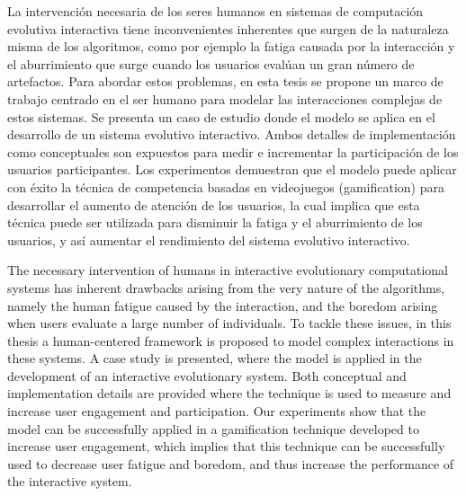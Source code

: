 


La intervenci\'on necesaria de los seres humanos en sistemas de computaci\'on
evolutiva interactiva tiene inconvenientes inherentes que surgen de la
naturaleza misma de los algoritmos, como por ejemplo la fatiga causada por la
interacci\'on y el aburrimiento que surge cuando los usuarios eval\'uan un gran
n\'umero de artefactos. Para abordar estos problemas, en esta tesis se propone
un marco de trabajo centrado en el ser humano para
modelar las interacciones complejas de estos sistemas. Se presenta un caso de
estudio donde el modelo se aplica en el desarrollo de un sistema evolutivo
interactivo. Ambos detalles de implementaci\'on como conceptuales
son expuestos para medir e incrementar la participaci\'on de los usuarios
participantes. Los experimentos demuestran que el modelo puede aplicar con
\'exito la t\'ecnica de competencia basadas en videojuegos (gamification) para
desarrollar el aumento de atenci\'on de los usuarios, la cual implica que esta
t\'ecnica puede ser utilizada para disminuir la fatiga y el aburrimiento de los
usuarios, y as\'i aumentar el rendimiento del sistema evolutivo interactivo.





The necessary intervention of humans in interactive evolutionary computational
systems has inherent drawbacks arising from the very nature of the algorithms,
namely the human fatigue caused by the interaction, and the boredom arising
when users evaluate a large number of individuals. To tackle these issues, in this
thesis a human-centered framework is proposed to model complex interactions in
these  systems. A case study is presented, where the model is applied in the
development of an interactive evolutionary system. Both conceptual
and implementation details are provided where the technique is used to measure
and increase user engagement and participation. Our experiments show that the
model can be successfully applied in a gamification technique developed to
increase user engagement, which implies that this technique can be successfully
used to decrease user fatigue and boredom, and thus increase the performance of
the interactive system.
